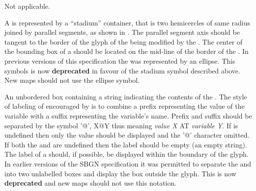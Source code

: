 \begin{glyphDescription}

\glyphSboTerm Not applicable.

\glyphContainer A  is represented by a
``stadium'' container, that is two hemicercles of same radius joined
by parallel segments, as shown in .  The parallel
segment axis should be tangent to the border of the glyph of the
 being modified by the . The center
of the bounding box of a  should be located on
the mid-line of the border of the . In previous versions of
this specification the  was represented by an
ellipse. This symbols is now \textbf{deprecated} in favour of the stadium
symbol described above. New \PD maps should not use the ellipse symbol.

\glyphLabel An unbordered box containing a string indicating the
contents of the . The style of labeling of
 encouraged by \SBGNPDLone is to combine a
prefix representing the value of the variable with a suffix
representing the variable's name.  Prefix and suffix should be
separated by the symbol '@', X@Y thus meaning \emph{value X} AT
\emph{variable Y}. If  is undefined then only the value
should be displayed and the '@' character omitted.  If both the
 and  are undefined then the label should
be empty (\ie an empty string). The label of a 
should, if possible, be displayed within the boundary of the glyph. In
earlier versions of the SBGN specification it was permitted to
separate the  and  into two unlabelled
boxes and display the  box outside the  glyph. This is now \textbf{deprecated} and new \PD maps
should not use this notation.



\end{glyphDescription}

